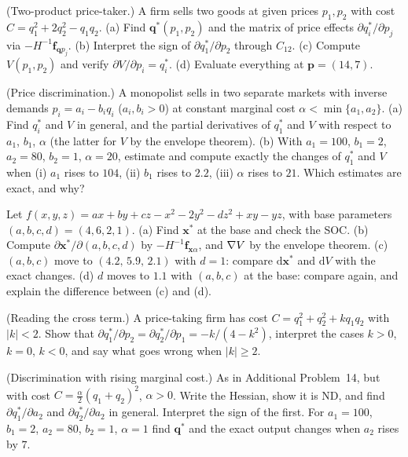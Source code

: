 \begin{problems}
  \item (Two-product price-taker.) A firm sells two goods at given prices
        $p_1,p_2$ with cost $C=q_1^{2}+2q_2^{2}-q_1q_2$. (a) Find
        $\mathbf{q}^*(p_1,p_2)$ and the matrix of price effects
        $\partial q_i^*/\partial p_j$ via $-H^{-1}\mathbf{f}_{\mathbf{q}p_j}$.
        (b) Interpret the sign of $\partial q_1^*/\partial p_2$ through
        $C_{12}$. (c) Compute $V(p_1,p_2)$ and verify
        $\partial V/\partial p_i=q_i^*$. (d) Evaluate everything at
        $\mathbf{p}=(14,7)$.
  \item (Price discrimination.) A monopolist sells in two separate markets
        with inverse demands $p_i=a_i-b_iq_i$ ($a_i,b_i>0$) at constant
        marginal cost $\alpha<\min\{a_1,a_2\}$. (a) Find $q_i^*$ and $V$ in
        general, and the partial derivatives of $q_1^*$ and $V$ with respect
        to $a_1$, $b_1$, $\alpha$ (the latter for $V$ by the envelope
        theorem). (b) With $a_1=100$, $b_1=2$, $a_2=80$, $b_2=1$,
        $\alpha=20$, estimate and compute exactly the changes of $q_1^*$
        and $V$ when (i) $a_1$ rises to $104$, (ii) $b_1$ rises to $2.2$,
        (iii) $\alpha$ rises to $21$. Which estimates are exact, and why?
  \item Let $f(x,y,z)=ax+by+cz-x^{2}-2y^{2}-dz^{2}+xy-yz$, with base
        parameters $(a,b,c,d)=(4,6,2,1)$.
        (a) Find $\mathbf{x}^*$ at the base and check the SOC.
        (b) Compute $\partial\mathbf{x}^*/\partial(a,b,c,d)$ by
        $-H^{-1}\mathbf{f}_{\mathbf{x}\alpha}$, and $\nabla V$ by the
        envelope theorem.
        (c) $(a,b,c)$ move to $(4.2,\,5.9,\,2.1)$ with $d=1$: compare
        $\mathrm{d}\mathbf{x}^*$ and $\mathrm{d}V$ with the exact changes.
        (d) $d$ moves to $1.1$ with $(a,b,c)$ at the base: compare again,
        and explain the difference between (c) and (d).
  \item (Reading the cross term.) A price-taking firm has cost
        $C=q_1^{2}+q_2^{2}+kq_1q_2$ with $|k|<2$. Show that
        $\partial q_1^*/\partial p_2=\partial q_2^*/\partial p_1=-k/(4-k^{2})$,
        interpret the cases $k>0$, $k=0$, $k<0$, and say what goes wrong
        when $|k|\ge2$.
  \item (Discrimination with rising marginal cost.) As in Additional Problem~14, but
        with cost $C=\tfrac{\alpha}{2}(q_1+q_2)^{2}$, $\alpha>0$. Write the
        Hessian, show it is ND, and find $\partial q_1^*/\partial a_2$ and
        $\partial q_2^*/\partial a_2$ in general. Interpret the sign of the
        first. For $a_1=100$, $b_1=2$, $a_2=80$, $b_2=1$, $\alpha=1$ find
        $\mathbf{q}^*$ and the exact output changes when $a_2$ rises by $7$.
\end{problems}

